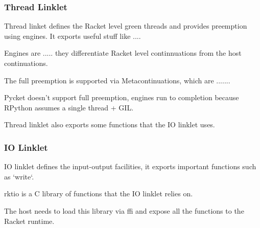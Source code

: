 			\subsubsection{Thread Linklet}

				\begin{paragraph-here}%
					Thread linket defines the Racket level green threads and provides preemption using engines. It exports useful stuff like ....
				\end{paragraph-here}

				\begin{paragraph-here}%
					Engines are ..... they differentiate Racket level continnuations from the host continuations.
				\end{paragraph-here}

				\begin{paragraph-here}%
					The full preemption is supported via Metacontinuations, which are .......
				\end{paragraph-here}

				\begin{paragraph-here}%
					Pycket doesn't support full preemption, engines run to completion because RPython assumes a single thread + GIL.
				\end{paragraph-here}

				\begin{paragraph-here}%
					Thread linklet also exports some functions that the IO linklet uses.
				\end{paragraph-here}

			\subsubsection{IO Linklet}

				\begin{paragraph-here}%
					IO linklet defines the input-output facilities, it exports important functions such as `write`.
				\end{paragraph-here}

				\begin{paragraph-here}%
					rktio is a C library of functions that the IO linklet relies on.
				\end{paragraph-here}

				\begin{paragraph-here}%
					The host needs to load this library via ffi and expose all the functions to the Racket runtime.
				\end{paragraph-here}

